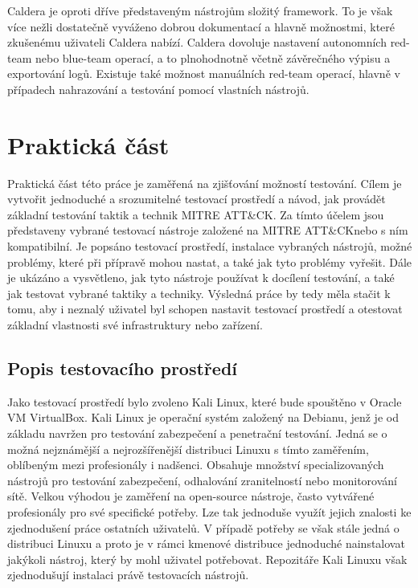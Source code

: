 Caldera je oproti dříve představeným nástrojům složitý framework.
To je však více nežli dostatečně vyváženo dobrou dokumentací a hlavně možnostmi, které zkušenému uživateli Caldera nabízí.
Caldera dovoluje nastavení autonomních red-team nebo blue-team operací, a to plnohodnotně včetně závěrečného výpisu a exportování logů.
Existuje také možnost manuálních red-team operací, hlavně v případech nahrazování a testování pomocí vlastních nástrojů.\cite{mitre_caldera_docs}


\section{Praktická část}\label{sec:prakticka-cast}
Praktická část této práce je zaměřená na zjišťování možností testování.
Cílem je vytvořit jednoduché a srozumitelné testovací prostředí a návod, jak provádět základní testování taktik a technik MITRE ATT\&CK\@.
Za tímto účelem jsou představeny vybrané testovací nástroje založené na MITRE ATT\&CK\@ nebo s ním kompatibilní.
Je popsáno testovací prostředí, instalace vybraných nástrojů, možné problémy, které při přípravě mohou nastat, a také jak tyto problémy vyřešit.
Dále je ukázáno a vysvětleno, jak tyto nástroje používat k docílení testování, a také jak testovat vybrané taktiky a techniky.
Výsledná práce by tedy měla stačit k tomu, aby i neznalý uživatel byl schopen nastavit testovací prostředí a otestovat základní vlastnosti své infrastruktury nebo zařízení.


\subsection{Popis testovacího prostředí}\label{subsec:popis-testovaciho-prostredi}%
Jako testovací prostředí bylo zvoleno Kali Linux, které bude spouštěno v Oracle VM VirtualBox.
Kali Linux je operační systém založený na Debianu, jenž je od základu navržen pro testování zabezpečení a penetrační testování.
Jedná se o možná nejznámější a nejrozšířenější distribuci Linuxu s tímto zaměřením, oblíbeným mezi profesionály i nadšenci.
Obsahuje množství specializovaných nástrojů pro testování zabezpečení, odhalování zranitelností nebo monitorování sítě.
Velkou výhodou je zaměření na open-source nástroje, často vytvářené profesionály pro své specifické potřeby.
Lze tak jednoduše využít jejich znalosti ke zjednodušení práce ostatních uživatelů.
V případě potřeby se však stále jedná o distribuci Linuxu a proto je v rámci kmenové distribuce jednoduché nainstalovat jakýkoli nástroj, který by mohl uživatel potřebovat.
Repozitáře Kali Linuxu však zjednodušují instalaci právě testovacích nástrojů.\cite{kali_mainpage}

